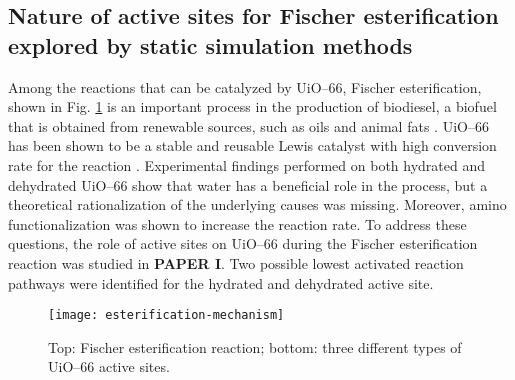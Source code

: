 \subsection*{Nature of active sites for Fischer esterification explored by static simulation methods}
 Among the reactions that can be catalyzed by UiO--66, Fischer esterification, shown in Fig. \ref{fig:esterification-mechanism} is an important process in the production of biodiesel, a biofuel that is obtained from renewable sources, such as oils and animal fats \cite{atadashi2011biodiesel, chouhan2011modern}. UiO--66 has been shown to be a stable and reusable Lewis catalyst with high conversion rate for the reaction \cite{cirujano2015conversion, cirujano2015zirconium}. Experimental findings performed on both hydrated and dehydrated UiO--66 show that water has a beneficial role in the process, but a theoretical rationalization of the underlying causes was missing. Moreover, amino functionalization was shown to increase the reaction rate. To address these questions, the role of active sites on UiO--66 during the Fischer esterification reaction was studied in \textbf{PAPER I}. Two possible lowest activated reaction pathways were identified for the hydrated and dehydrated active site.
\begin{figure}[!htbp]
	\centering
	\texttt{[image: esterification-mechanism]}
	\caption{Top: Fischer esterification reaction; bottom: three different types of UiO--66 active sites.}
	\label{fig:esterification-mechanism}
\end{figure}

